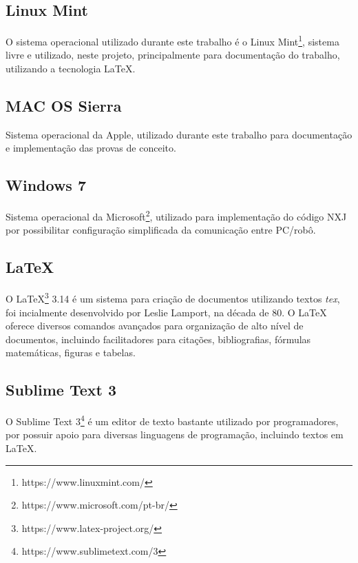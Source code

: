 	\subsection{Linux Mint} %
	\label{sub:linux_mint}
		O sistema operacional utilizado durante este trabalho é o Linux Mint\footnote{https://www.linuxmint.com/}, sistema livre e utilizado, neste projeto, principalmente para documentação do trabalho, utilizando a tecnologia LaTeX.

	\subsection{MAC OS Sierra}
	\label{sub:mac}
		Sistema operacional da Apple, utilizado durante este trabalho para documentação e implementação das provas de conceito.


	\subsection{Windows 7} %
	\label{sub:windows_7}

		Sistema operacional da Microsoft\footnote{https://www.microsoft.com/pt-br/}, utilizado para implementação do código NXJ por possibilitar configuração simplificada da comunicação entre PC/robô.

	\subsection{LaTeX} %
	\label{sub:latex}

	O LaTeX\footnote{https://www.latex-project.org/} 3.14 é um sistema para criação de documentos utilizando textos \textit{tex}, foi incialmente desenvolvido por Leslie Lamport, na década de 80. O LaTeX oferece diversos comandos avançados para organização de alto nível de documentos, incluindo facilitadores para citações, bibliografias, fórmulas matemáticas, figuras e tabelas.

	\subsection{Sublime Text 3} %
	\label{sub:sublime_text_3}
		O Sublime Text 3\footnote{https://www.sublimetext.com/3} é um editor de texto bastante utilizado por programadores, por possuir apoio para diversas linguagens de programação, incluindo textos em LaTeX.


